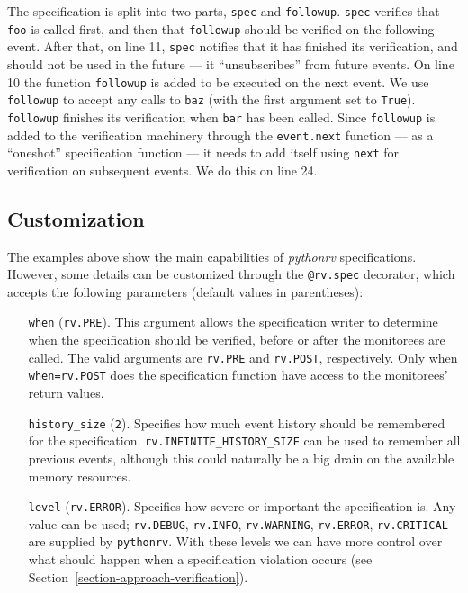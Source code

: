 The specification is split into two parts, \texttt{spec} and \texttt{followup}.
\texttt{spec} verifies that \texttt{foo} is called first, and then that
\texttt{followup} should be verified on the following event. After that, on
line 11, \texttt{spec} notifies that it has finished its verification, and
should not be used in the future --- it ``unsubscribes'' from future events. On
line 10 the function \texttt{followup} is added to be executed on the next
event. We use \texttt{followup} to accept any calls to \texttt{baz} (with the
first argument set to \texttt{True}). \texttt{followup} finishes its
verification when \texttt{bar} has been called. Since \texttt{followup} is
added to the verification machinery through the \texttt{event.next} function
--- as a ``oneshot'' specification function --- it needs to add itself using
\texttt{next} for verification on subsequent events. We do this on line 24.



\subsection{Customization}

The examples above show the main capabilities of \textit{pythonrv}
specifications. However, some details can be customized through the
\texttt{@rv.spec} decorator, which accepts the following parameters (default
values in parentheses):

\begin{itemize}
  \item[\texttt{when}] (\texttt{rv.PRE}). This argument allows the
    specification writer to determine when the specification should be
    verified, before or after the monitorees are called. The valid arguments
    are \texttt{rv.PRE} and \texttt{rv.POST}, respectively. Only when
    \texttt{when=rv.POST} does the specification function have access to the
    monitorees' return values.

  \item[\texttt{history\_size}] (\texttt{2}). Specifies how much event history
    should be remembered for the specification.
    \texttt{rv.INFINITE\_HISTORY\_SIZE} can be used to remember all previous
    events, although this could naturally be a big drain on the available
    memory resources.

  \item[\texttt{level}] (\texttt{rv.ERROR}). Specifies how severe or important
    the specification is. Any value can be used; \texttt{rv.DEBUG},
    \texttt{rv.INFO}, \texttt{rv.WARNING}, \texttt{rv.ERROR},
    \texttt{rv.CRITICAL} are supplied by \texttt{pythonrv}. With these levels
    we can have more control over what should happen when a specification
    violation occurs (see Section~\ref{section-approach-verification}).
\end{itemize}


